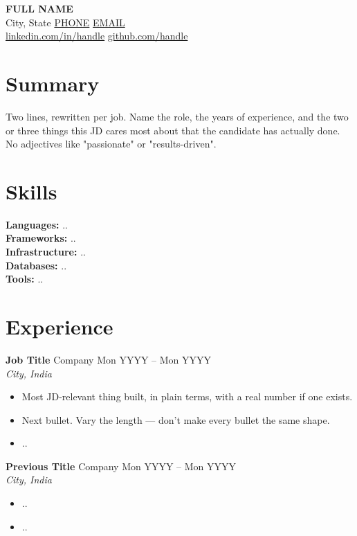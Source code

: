 \documentclass[11pt,a4paper]{article}
\newcommand{\role}[4]{%
  \textbf{#1} \textendash{} #2 \hfill #4\\%
  \textit{#3}\vspace{-0.2em}%
}
\begin{document}
\begin{center}
  {\LARGE\bfseries {{FULL NAME}}}\\[0.3em]
  {{City, State}} \textbullet{} \href{tel:{{PHONE}}}{{{PHONE}}} \textbullet{}
  \href{mailto:{{EMAIL}}}{{{EMAIL}}}\\
  \href{{{LINKEDIN URL}}}{{{linkedin.com/in/handle}}} \textbullet{}
  \href{{{GITHUB URL}}}{{{github.com/handle}}}
\end{center}

\section{Summary}
{{Two lines, rewritten per job. Name the role, the years of experience, and the two or three
things this JD cares most about that the candidate has actually done. No adjectives like
"passionate" or "results-driven".}}

\section{Skills}
\textbf{Languages:} {{..}} \\
\textbf{Frameworks:} {{..}} \\
\textbf{Infrastructure:} {{..}} \\
\textbf{Databases:} {{..}} \\
\textbf{Tools:} {{..}}

\section{Experience}

\role{{{Job Title}}}{{{Company}}}{{{City, India}}}{{{Mon YYYY}} -- {{Mon YYYY}}}
\begin{itemize}
  \item {{Most JD-relevant thing built, in plain terms, with a real number if one exists.}}
  \item {{Next bullet. Vary the length — don't make every bullet the same shape.}}
  \item {{..}}
\end{itemize}

\role{{{Previous Title}}}{{{Company}}}{{{City, India}}}{{{Mon YYYY}} -- {{Mon YYYY}}}
\begin{itemize}
  \item {{..}}
  \item {{..}}
\end{itemize}
\end{document}
